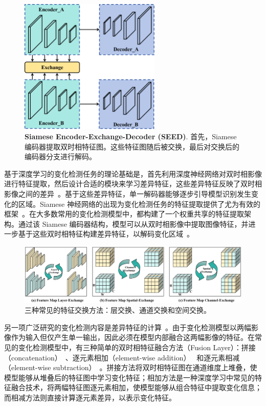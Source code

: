 \begin{figure}[!htbp]
  \centering
  \includegraphics[width=0.6\textwidth]{paper_figures/变化检测任务基础范式设计/SEED1d.png}
  \caption{\textbf{Siamese Encoder-Exchange-Decoder (SEED)}. 首先，Siamese 编码器提取双时相特征图。这些特征图随后被交换，最后对交换后的编码器分支进行解码。}
  \label{fig:SEED1d}
\end{figure}

基于深度学习的变化检测任务的理论基础是，首先利用深度神经网络对双时相影像进行特征提取，然后设计合适的模块来学习差异特征，这些差异特征反映了双时相影像之间的差异~\cite{shi_change_2020,lv_land_2022}。基于这些差异特征，单一解码器能够逐步引导模型识别发生变化的区域。Siamese 神经网络的出现为变化检测任务的特征提取提供了尤为有效的框架~\cite{shi_deeply_2022}。在大多数常用的变化检测模型中，都构建了一个权重共享的特征提取架构。通过该 Siamese 编码器结构，模型可以从双时相影像中提取图像特征，并进一步基于这些双时相特征构建差异特征，以解码变化区域~\cite{zhu_land-useland-cover_2022-1}。


\begin{figure}[!htbp]
  \centering
  \includegraphics[width=\textwidth]{paper_figures/变化检测任务基础范式设计/seed_exchange.png}
  \caption{三种常见的特征交换方法：层交换、通道交换和空间交换。}
  \label{fig:seed_exchange}
\end{figure}

另一项广泛研究的变化检测内容是差异特征的计算~\cite{pei_feature_2022,x_zhang_difunet_2022,gu2023fdff}。由于变化检测模型以两幅影像作为输入但仅产生单一输出，因此必须在模型内部融合这两幅影像的特征。在常见的变化检测模型中，有三种简单的双时相特征融合方法（Fusion Layer）：拼接（concatenation）~\cite{gu2023fdff,wan_d-tnet_2022-3,wang_hmcnet_2022-2}、逐元素相加（element-wise addition）~\cite{pei_feature_2022,gu2023fdff} 和逐元素相减（element-wise subtraction）~\cite{gu2023fdff,shi_deeply_2022,x_zhang_difunet_2022}。拼接方法将双时相特征图在通道维度上堆叠，使模型能够从堆叠后的特征图中学习变化特征；相加方法是一种深度学习中常见的特征融合技术，将两幅特征图逐元素相加，使模型能够从组合特征中提取变化信息；而相减方法则直接计算逐元素差异，以表示变化特征。

